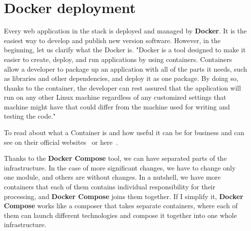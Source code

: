 \section{Docker deployment}\label{sec:docker-deployment}
Every web application in the stack is deployed and managed by \textbf{Docker}.
It is the easiest way to develop and publish new version software.
However, in the beginning, let us clarify what the Docker is.
"Docker is a tool designed to make it easier to create, deploy, and run applications by using containers.
Containers allow a developer to package up an application with all of the parts it needs, such as libraries and other dependencies, and deploy it as one package.
By doing so, thanks to the container, the developer can rest assured that the application will run on any other Linux machine regardless of any customized settings that machine might have that could differ from the machine used for writing and testing the code."\cite{dockerDescription}

To read about what a Container is and how useful it can be for business and can see on their official websites~\cite{dockerContainer} or here~\cite{dockerDescription}.

Thanks to the \textbf{Docker Compose} tool, we can have separated parts of the infrastructure.
In the case of more significant changes, we have to change only one module, and others are without changes.
In a nutshell, we have more containers that each of them contains individual responsibility for their processing, and \textbf{Docker Compose} joins them together.
If I simplify it, \textbf{Docker Compose} works like a composer that takes separate containers, where each of them can launch different technologies and compose it together into one whole infrastructure.\cite{dockerCompose}
